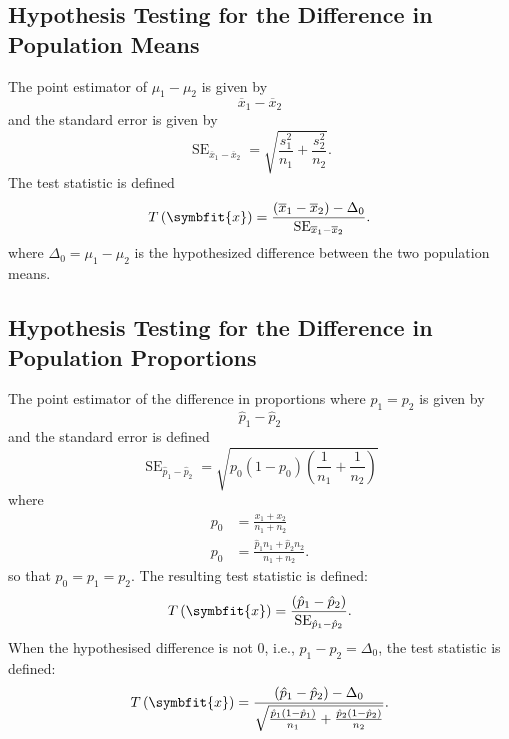 \documentclass{article}
\begin{document}
\begin{multicols}{3}
\subsection{Hypothesis Testing for the Difference in Population Means}
The point estimator of \(\mu_1 - \mu_2\) is given by
\begin{equation*}
    \overline{x}_1 - \overline{x}_2
\end{equation*}
and the standard error is given by
\begin{equation*}
    \operatorname{SE}_{\overline{x}_1 - \overline{x}_2} = \sqrt{\frac{s_1^2}{n_1} + \frac{s_2^2}{n_2}}.
\end{equation*}
The test statistic is defined
\begin{equation*}
    T\left( \symbfit{x} \right) = \frac{\left( \overline{x}_1 - \overline{x}_2 \right) - \Delta_0}{\operatorname{SE}_{\overline{x}_1 - \overline{x}_2}}.
\end{equation*}
where \(\Delta_0 = \mu_1 - \mu_2\) is the hypothesized difference between the two population means.
\subsection{Hypothesis Testing for the Difference in Population Proportions}
The point estimator of the difference in proportions where \(p_1 = p_2\) is given by
\begin{equation*}
    \hat{p}_1 - \hat{p}_2
\end{equation*}
and the standard error is defined
\begin{equation*}
    \operatorname{SE}_{\hat{p}_1 - \hat{p}_2} = \sqrt{p_0 \left( 1 - p_0 \right) \left( \frac{1}{n_1} + \frac{1}{n_2} \right)}
\end{equation*}
where
\begin{align*}
    p_0 & = \frac{x_1 + x_2}{n_1 + n_2}                      \\
    p_0 & = \frac{\hat{p}_1 n_1 + \hat{p}_2 n_2}{n_1 + n_2}.
\end{align*}
so that \(p_0 = p_1 = p_2\).
The resulting test statistic is defined:
\begin{equation*}
    T\left( \symbfit{x} \right) = \frac{\left( \hat{p}_1 - \hat{p}_2 \right)}{\operatorname{SE}_{\hat{p}_1 - \hat{p}_2}}.
\end{equation*}
When the hypothesised difference is not 0, i.e., \(p_1 - p_2 = \Delta_0\), the test statistic is defined:
\begin{equation*}
    T\left( \symbfit{x} \right) = \frac{\left( \hat{p}_1 - \hat{p}_2 \right) - \Delta_0}{\sqrt{\frac{\hat{p}_1 \left( 1 - \hat{p}_1 \right)}{n_1} + \frac{\hat{p}_2 \left( 1 - \hat{p}_2 \right)}{n_2}}}.
\end{equation*}

\end{multicols}
\end{document}
